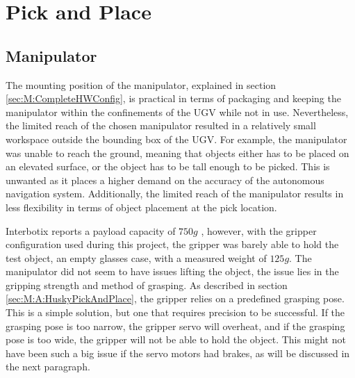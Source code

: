 


\section{Pick and Place} \label{sec:D:PickAndPlace}
\subsection{Manipulator} \label{sec:D:PAP:Manipulator}
The mounting position of the manipulator, explained in section \ref{sec:M:CompleteHWConfig}, is practical in terms of packaging and keeping the manipulator within the confinements of the UGV while not in use. Nevertheless, the limited reach of the chosen manipulator resulted in a relatively small workspace outside the bounding box of the UGV. For example, the manipulator was unable to reach the ground, meaning that objects either has to be placed on an elevated surface, or the object has to be tall enough to be picked. This is unwanted as it places a higher demand on the accuracy of the autonomous navigation system. Additionally, the limited reach of the manipulator results in less flexibility in terms of object placement at the pick location.

Interbotix reports a payload capacity of $750g$ \cite{interbotix_vx300}, however, with the gripper configuration used during this project, the gripper was barely able to hold the test object, an empty glasses case, with a measured weight of $125g$. The manipulator did not seem to have issues lifting the object, the issue lies in the gripping strength and method of grasping. As described in section \ref{sec:M:A:HuskyPickAndPlace}, the gripper relies on a predefined grasping pose. This is a simple solution, but one that requires precision to be successful. If the grasping pose is too narrow, the gripper servo will overheat, and if the grasping pose is too wide, the gripper will not be able to hold the object. This might not have been such a big issue if the servo motors had brakes, as will be discussed in the next paragraph.


